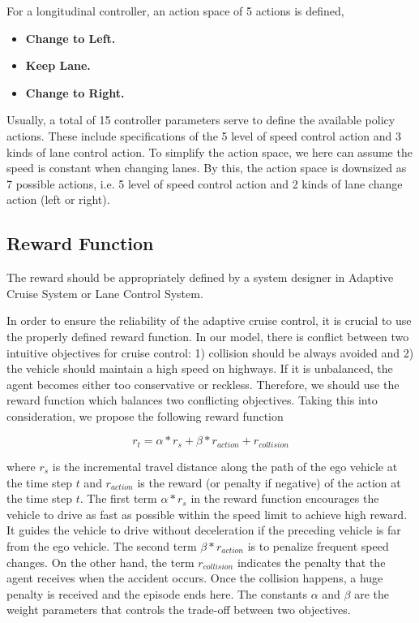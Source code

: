 For a longitudinal controller, an action space of 5 actions is defined,

\begin{itemize}

    \item \textbf{Change to Left.}
    
    \item \textbf{Keep Lane.} 
    
    \item \textbf{Change to Right.} 

\end{itemize}

Usually, a total of 15 controller parameters serve to define the available policy actions. These include specifications of the 5 level of speed control action and 3 kinds of lane control action. To simplify the action space, we here can assume the speed is constant when changing lanes. By this, the action space is downsized as 7 possible actions, i.e. 5 level of speed control action and 2 kinds of lane change action (left or right).

\subsection{Reward Function}

The reward should be appropriately defined by a system designer in Adaptive Cruise System or Lane Control System.

In order to ensure the reliability of the adaptive cruise control, it is crucial to use the properly defined reward function. In our model, there is conflict between two intuitive objectives for cruise control: 1) collision should be always avoided and 2) the vehicle should maintain a high speed on highways. If it is unbalanced, the agent becomes either too conservative or reckless. Therefore, we should use the reward function which balances two conflicting objectives. Taking this into consideration, we propose the following reward function

\begin{equation} \label{eq:reward-func1}
r_t = \alpha * r_s + \beta *  r_{action} + r_{collision}
\end{equation}

where $r_s$ is the incremental travel distance along the path of the ego vehicle at the time step $t$ and $r_{action}$  is the reward (or penalty if negative) of the action at the time step $t$. The first term $ \alpha * r_s $ in the reward function encourages the vehicle to drive as fast as possible within the speed limit to achieve high reward. It guides the vehicle to drive without deceleration if the preceding vehicle is far from the ego vehicle. The second term $\beta *  r_{action}$ is to penalize frequent speed changes. On the other hand, the term $r_{collision}$ indicates the penalty that the agent receives when the accident occurs. Once the collision happens, a huge penalty is received and the episode ends here. The constants $\alpha$ and $\beta$ are the weight parameters that controls the trade-off between two objectives.

